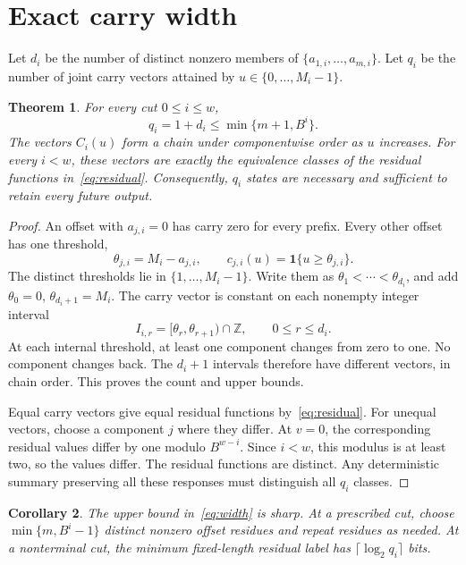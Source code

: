 \documentclass[11pt,a4paper]{article}
\newtheorem{theorem}{Theorem}
\newtheorem{corollary}[theorem]{Corollary}
\newcommand{\ind}{\mathbf 1}
\begin{document}
\section{Exact carry width}
Let $d_i$ be the number of distinct nonzero members of
$\{a_{1,i},\ldots,a_{m,i}\}$. Let $q_i$ be the number of joint carry
vectors attained by $u\in\{0,\ldots,M_i-1\}$.

\begin{theorem}\label{thm:width}
For every cut $0\leq i\leq w$,
\begin{equation}\label{eq:width}
 \boxed{q_i=1+d_i\leq\min\{m+1,B^i\}.}
\end{equation}
The vectors $C_i(u)$ form a chain under componentwise order as $u$ increases.
For every $i<w$, these vectors are exactly the equivalence classes of the
residual functions in~\eqref{eq:residual}. Consequently, $q_i$ states are
necessary and sufficient to retain every future output.
\end{theorem}

\begin{proof}
An offset with $a_{j,i}=0$ has carry zero for every prefix.
Every other offset has one threshold,
\begin{equation}\label{eq:threshold}
 \theta_{j,i}=M_i-a_{j,i},\qquad
 c_{j,i}(u)=\ind\{u\geq\theta_{j,i}\}.
\end{equation}
The distinct thresholds lie in $\{1,\ldots,M_i-1\}$.
Write them as $\theta_1<\cdots<\theta_{d_i}$, and add
$\theta_0=0$, $\theta_{d_i+1}=M_i$.
The carry vector is constant on each nonempty integer interval
\[
 I_{i,r}=[\theta_r,\theta_{r+1})\cap\mathbb Z,
 \qquad 0\leq r\leq d_i.
\]
At each internal threshold, at least one component changes from zero to one.
No component changes back. The $d_i+1$ intervals therefore have different
vectors, in chain order. This proves the count and upper bounds.

Equal carry vectors give equal residual functions by~\eqref{eq:residual}.
For unequal vectors, choose a component $j$ where they differ.
At $v=0$, the corresponding residual values differ by one modulo
$B^{w-i}$. Since $i<w$, this modulus is at least two, so the values differ.
The residual functions are distinct. Any deterministic summary preserving
all these responses must distinguish all $q_i$ classes.
\end{proof}

\begin{corollary}\label{cor:sharp}
The upper bound in~\eqref{eq:width} is sharp. At a prescribed cut, choose
$\min\{m,B^i-1\}$ distinct nonzero offset residues and repeat residues as
needed. At a nonterminal cut, the minimum fixed-length residual label has
$\lceil\log_2q_i\rceil$ bits.
\end{corollary}
\end{document}
